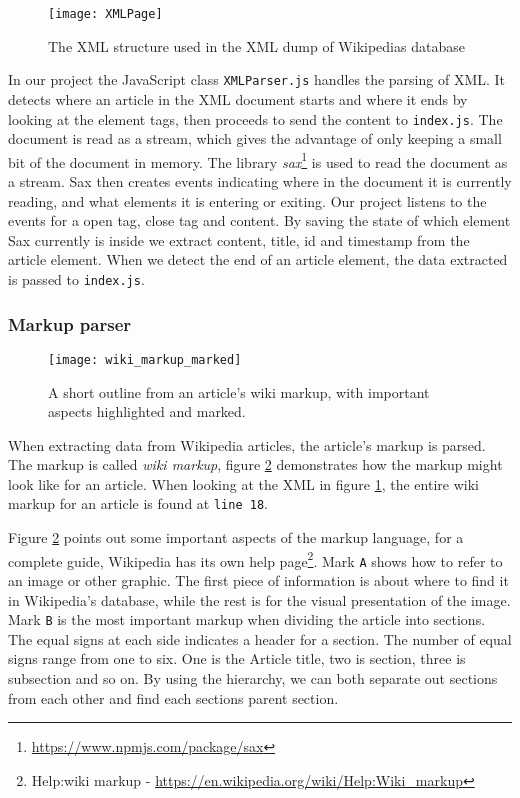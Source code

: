\begin{figure}[h]
\caption{The XML structure used in the XML dump of Wikipedias database}
\texttt{[image: XMLPage]}
\label{fig:xml}
\end{figure}

In our project the JavaScript class \texttt{XMLParser.js} handles the parsing of XML. It detects where an article in the XML document starts and where it ends by looking at the element tags, then proceeds to send the content to \texttt{index.js}. The document is read as a stream, which gives the advantage of only keeping a small bit of the document in memory. The library \textit{sax}\footnote{\url{https://www.npmjs.com/package/sax}} is used to read the document as a stream. Sax then creates events indicating where in the document it is currently reading, and what elements it is entering or exiting. Our project listens to the events for a open tag, close tag and content. By saving the state of which element Sax currently is inside we extract content, title, id and timestamp from the article element. When we detect the end of an article element, the data extracted is passed to \texttt{index.js}.

\subsubsection{Markup parser}

\begin{figure}[h]
\caption{A short outline from an article's wiki markup, with important aspects highlighted and marked. }
\texttt{[image: wiki\_markup\_marked]}
\label{fig:wiki_markup}
\end{figure}

When extracting data from Wikipedia articles, the article's markup is parsed. The markup is called \textit{wiki markup}, figure \ref{fig:wiki_markup} demonstrates how the markup might look like for an article. When looking at the XML in figure \ref{fig:xml}, the entire wiki markup for an article is found at \texttt{line 18}.

Figure \ref{fig:wiki_markup} points out some important aspects of the markup language, for a complete guide, Wikipedia has its own help page\footnote{Help:wiki markup - \url{https://en.wikipedia.org/wiki/Help:Wiki_markup}}. Mark \texttt{A} shows how to refer to an image or other graphic. The first piece of information is about where to find it in Wikipedia's database, while the rest is for the visual presentation of the image. Mark \texttt{B} is the most important markup when dividing the article into sections. The equal signs at each side indicates a header for a section. The number of equal signs range from one to six. One is the Article title, two is section, three is subsection and so on. By using the hierarchy, we can both separate out sections from each other and find each sections parent section.

